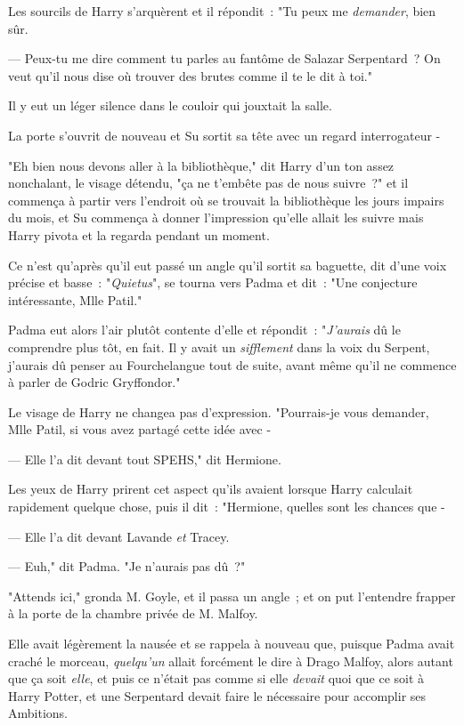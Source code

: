 Les sourcils de Harry s'arquèrent et il répondit~: "Tu peux me \emph{demander}, bien sûr.

--- Peux-tu me dire comment tu parles au fantôme de Salazar Serpentard~? On veut qu'il nous dise où trouver des brutes comme il te le dit à toi."

Il y eut un léger silence dans le couloir qui jouxtait la salle.

La porte s'ouvrit de nouveau et Su sortit sa tête avec un regard interrogateur -

"Eh bien nous devons aller à la bibliothèque," dit Harry d'un ton assez nonchalant, le visage détendu, "ça ne t'embête pas de nous suivre~?" et il commença à partir vers l'endroit où se trouvait la bibliothèque les jours impairs du mois, et Su commença à donner l'impression qu'elle allait les suivre mais Harry pivota et la regarda pendant un moment.

Ce n'est qu'après qu'il eut passé un angle qu'il sortit sa baguette, dit d'une voix précise et basse~: "\emph{Quietus}", se tourna vers Padma et dit~: "Une conjecture intéressante, Mlle Patil."

Padma eut alors l'air plutôt contente d'elle et répondit~: "\emph{J'aurais} dû le comprendre plus tôt, en fait. Il y avait un \emph{sifflement} dans la voix du Serpent, j'aurais dû penser au Fourchelangue tout de suite, avant même qu'il ne commence à parler de Godric Gryffondor."

Le visage de Harry ne changea pas d'expression. "Pourrais-je vous demander, Mlle Patil, si vous avez partagé cette idée avec -

--- Elle l'a dit devant tout SPEHS," dit Hermione.

Les yeux de Harry prirent cet aspect qu'ils avaient lorsque Harry calculait rapidement quelque chose, puis il dit~: "Hermione, quelles sont les chances que -

--- Elle l'a dit devant Lavande \emph{et} Tracey.

--- Euh," dit Padma. "Je n'aurais pas dû~?"

\later

"Attends ici," gronda M. Goyle, et il passa un angle~; et on put l'entendre frapper à la porte de la chambre privée de M. Malfoy.

Elle avait légèrement la nausée et se rappela à nouveau que, puisque Padma avait craché le morceau, \emph{quelqu'un} allait forcément le dire à Drago Malfoy, alors autant que ça soit \emph{elle}, et puis ce n'était pas comme si elle \emph{devait} quoi que ce soit à Harry Potter, et une Serpentard devait faire le nécessaire pour accomplir ses Ambitions.

